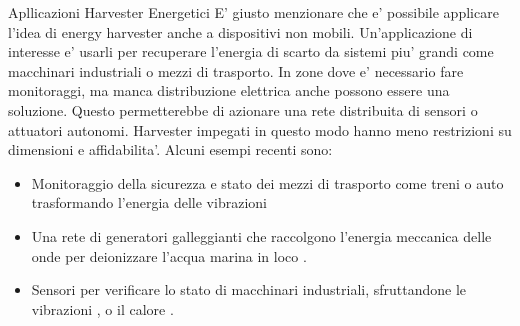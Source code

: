 \begin{section}{Apllicazioni Harvester Energetici}
    E' giusto menzionare che e' possibile applicare l'idea di energy harvester anche a dispositivi non mobili. Un'applicazione di interesse e' usarli per recuperare l'energia di scarto da sistemi piu' grandi come macchinari industriali o mezzi di trasporto. In zone dove e' necessario fare monitoraggi, ma manca distribuzione elettrica anche possono essere una soluzione. Questo permetterebbe di azionare una rete distribuita di sensori o attuatori autonomi. Harvester impegati in questo modo hanno meno restrizioni su dimensioni e affidabilita'. Alcuni esempi recenti sono: \begin{itemize}
        \item Monitoraggio della sicurezza e stato dei mezzi di trasporto come treni o auto trasformando l'energia delle vibrazioni \cite{liSmartRailwayTransportation, liuCompactHybridizedTriboelectricelectromagnetic2024}
        \item Una rete di generatori galleggianti che raccolgono l'energia meccanica delle onde per deionizzare l'acqua marina in loco \cite{renWavepoweredCapacitiveDeionization2024}. 
        \item Sensori per verificare lo stato di macchinari industriali, sfruttandone le vibrazioni \cite{alvarezruedaVibrationEnergyHarvesting2024, gaoHybridGeneratorEfficient2024}, o il calore \cite{deoliveiraDevelopmentHybridEnergy2024}.
    \end{itemize}
    
\end{section}
